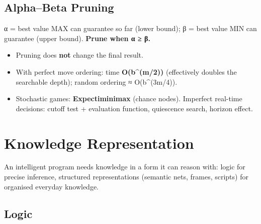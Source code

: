 \needspace{125pt}

\hypertarget{p2-10--32-alphabeta-pruning}{%
\subsection{Alpha--Beta Pruning}\label{p2-10--32-alphabeta-pruning}}

α = best value MAX can guarantee so far (lower bound); β = best value MIN can guarantee (upper bound). \textbf{Prune when α ≥ β.}



\begin{itemize}
\tightlist
\item
  Pruning does \textbf{not} change the final result.
\item
  With perfect move ordering: time \textbf{O(b\^{}(m/2))} (effectively doubles the searchable depth); random ordering ≈ O(b\^{}(3m/4)).
\item
  Stochastic games: \textbf{Expectiminimax} (chance nodes). Imperfect real-time decisions: cutoff test + evaluation function, quiescence search, horizon effect.
\end{itemize}

\needspace{161pt}

\hypertarget{p2-10--4-knowledge-representation}{%
\section{Knowledge Representation}\label{p2-10--4-knowledge-representation}}

An intelligent program needs knowledge in a form it can reason with: logic for precise inference, structured
representations (semantic nets, frames, scripts) for organised everyday knowledge.

\needspace{95pt}

\hypertarget{p2-10--41-logic}{%
\subsection{Logic}\label{p2-10--41-logic}}

